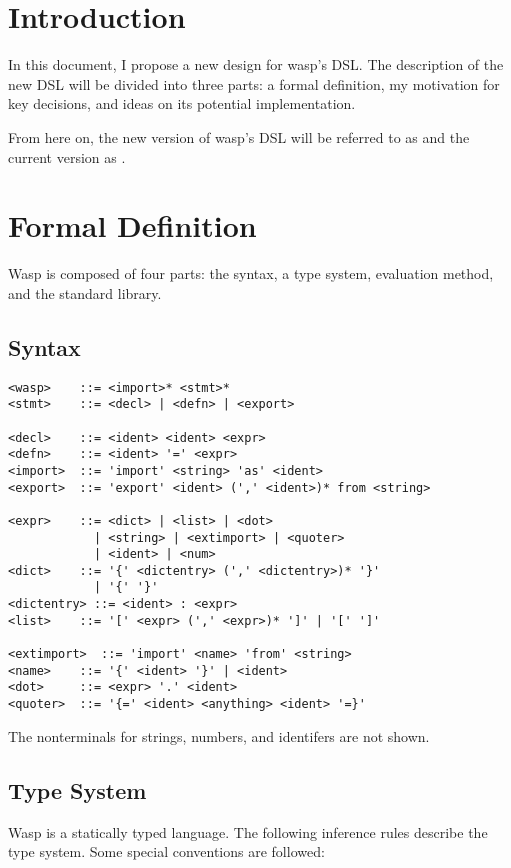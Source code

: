 \section{Introduction}

In this document, I propose a new design for wasp's DSL. The description
of the new DSL will be divided into three parts: a formal definition, my
motivation for key decisions, and ideas on its potential implementation.

From here on, the new version of wasp's DSL will be referred to as 
and the current version as .

\section{Formal Definition}

Wasp is composed of four parts: the syntax, a type system, evaluation method,
and the standard library.

\subsection{Syntax}

\begin{verbatim}
<wasp>    ::= <import>* <stmt>*
<stmt>    ::= <decl> | <defn> | <export>

<decl>    ::= <ident> <ident> <expr>
<defn>    ::= <ident> '=' <expr>
<import>  ::= 'import' <string> 'as' <ident>
<export>  ::= 'export' <ident> (',' <ident>)* from <string>

<expr>    ::= <dict> | <list> | <dot>
            | <string> | <extimport> | <quoter>
            | <ident> | <num>
<dict>    ::= '{' <dictentry> (',' <dictentry>)* '}'
            | '{' '}'
<dictentry> ::= <ident> : <expr>
<list>    ::= '[' <expr> (',' <expr>)* ']' | '[' ']'

<extimport>  ::= 'import' <name> 'from' <string>
<name>    ::= '{' <ident> '}' | <ident>
<dot>     ::= <expr> '.' <ident>
<quoter>  ::= '{=' <ident> <anything> <ident> '=}'
\end{verbatim}

The nonterminals for strings, numbers, and identifers are not shown.

\subsection{Type System}

Wasp is a statically typed language. The following inference rules describe the
type system. Some special conventions are followed:

